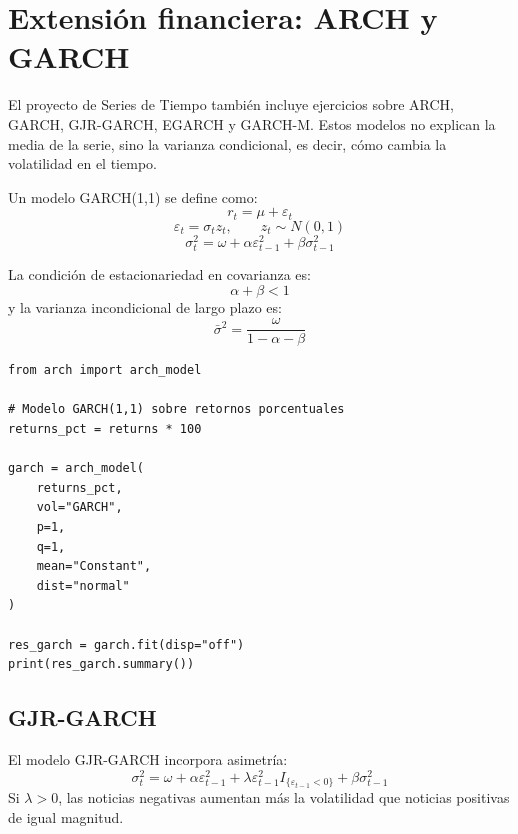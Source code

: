 \documentclass[12pt,a4paper]{article}
\begin{document}
\section{Extensión financiera: ARCH y GARCH}

\begin{markdowncell}
El proyecto de Series de Tiempo también incluye ejercicios sobre ARCH, GARCH, GJR-GARCH, EGARCH y GARCH-M. Estos modelos no explican la media de la serie, sino la varianza condicional, es decir, cómo cambia la volatilidad en el tiempo.
\end{markdowncell}

\begin{latexcell}
Un modelo GARCH(1,1) se define como:
\[
r_t = \mu + \varepsilon_t
\]
\[
\varepsilon_t = \sigma_t z_t, \qquad z_t \sim N(0,1)
\]
\[
\sigma_t^2 = \omega + \alpha \varepsilon_{t-1}^2 + \beta \sigma_{t-1}^2
\]
\end{latexcell}

\begin{latexcell}
La condición de estacionariedad en covarianza es:
\[
\alpha+\beta<1
\]
y la varianza incondicional de largo plazo es:
\[
\bar{\sigma}^2 = \frac{\omega}{1-\alpha-\beta}
\]
\end{latexcell}

\begin{lstlisting}[style=pythonstyle]
from arch import arch_model

# Modelo GARCH(1,1) sobre retornos porcentuales
returns_pct = returns * 100

garch = arch_model(
    returns_pct,
    vol="GARCH",
    p=1,
    q=1,
    mean="Constant",
    dist="normal"
)

res_garch = garch.fit(disp="off")
print(res_garch.summary())
\end{lstlisting}

\subsection{GJR-GARCH}

\begin{latexcell}
El modelo GJR-GARCH incorpora asimetría:
\[
\sigma_t^2 =
\omega + \alpha \varepsilon_{t-1}^2
+ \lambda \varepsilon_{t-1}^2 I_{\{\varepsilon_{t-1}<0\}}
+ \beta \sigma_{t-1}^2
\]
Si \(\lambda>0\), las noticias negativas aumentan más la volatilidad que noticias positivas de igual magnitud.
\end{latexcell}
\end{document}

